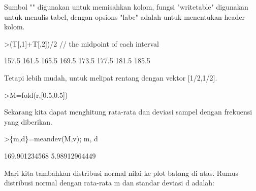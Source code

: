 \documentclass[a4paper,10pt]{article}
\begin{document}
\begin{eulernotebook}
\begin{eulercomment}
Sumbol "\textbar{}" digunakan untuk memisahkan kolom, fungsi "writetable"
digunakan untuk menulis tabel, dengan opsions "labc" adalah untuk
menentukan header kolom.
\end{eulercomment}
\begin{eulerprompt}
>(T[,1]+T[,2])/2 // the midpoint of each interval
\end{eulerprompt}
\begin{euleroutput}
          157.5 
          161.5 
          165.5 
          169.5 
          173.5 
          177.5 
          181.5 
          185.5 
\end{euleroutput}
\begin{eulercomment}
Tetapi lebih mudah, untuk melipat rentang dengan vektor [1/2,1/2].
\end{eulercomment}
\begin{eulerprompt}
>M=fold(r,[0.5,0.5])
\end{eulerprompt}
\begin{euleroutput}
  [157.5,  161.5,  165.5,  169.5,  173.5,  177.5,  181.5,  185.5]
\end{euleroutput}
\begin{eulercomment}
Sekarang kita dapat menghitung rata-rata dan deviasi sampel dengan
frekuensi yang diberikan.
\end{eulercomment}
\begin{eulerprompt}
>\{m,d\}=meandev(M,v); m, d
\end{eulerprompt}
\begin{euleroutput}
  169.901234568
  5.98912964449
\end{euleroutput}
\begin{eulercomment}
Mari kita tambahkan distribusi normal nilai ke plot batang di atas.
Rumus distribusi normal dengan rata-rata m dan standar deviasi d
adalah:


\end{eulercomment}
\end{eulernotebook}
\end{document}
